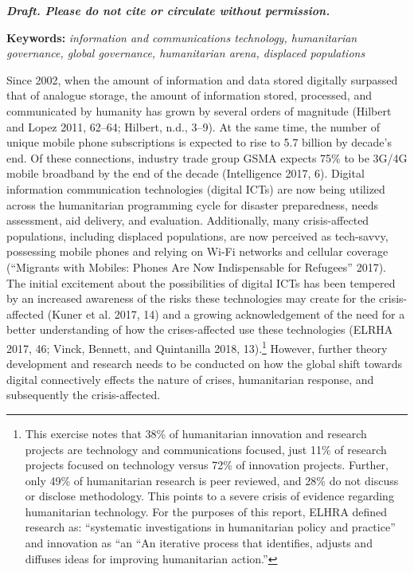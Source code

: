 \textbf{\emph{Draft. Please do not cite or circulate without
permission.}}

\textbf{Keywords:} \emph{information and communications technology,
humanitarian governance, global governance, humanitarian arena,
displaced populations}

Since 2002, when the amount of information and data stored digitally
surpassed that of analogue storage, the amount of information stored,
processed, and communicated by humanity has grown by several orders of
magnitude (Hilbert and Lopez 2011, 62--64; Hilbert, n.d., 3--9). At the
same time, the number of unique mobile phone subscriptions is expected
to rise to 5.7 billion by decade's end. Of these connections, industry
trade group GSMA expects 75\% to be 3G/4G mobile broadband by the end of
the decade (Intelligence 2017, 6). Digital information communication
technologies (digital ICTs) are now being utilized across the
humanitarian programming cycle for disaster preparedness, needs
assessment, aid delivery, and evaluation. Additionally, many
crisis-affected populations, including displaced populations, are now
perceived as tech-savvy, possessing mobile phones and relying on Wi-Fi
networks and cellular coverage (``Migrants with Mobiles: Phones Are Now
Indispensable for Refugees'' 2017). The initial excitement about the
possibilities of digital ICTs has been tempered by an increased
awareness of the risks these technologies may create for the
crisis-affected (Kuner et al. 2017, 14) and a growing acknowledgement of
the need for a better understanding of how the crises-affected use these
technologies (ELRHA 2017, 46; Vinck, Bennett, and Quintanilla 2018,
13).\footnote{This exercise notes that 38\% of humanitarian innovation
  and research projects are technology and communications focused, just
  11\% of research projects focused on technology versus 72\% of
  innovation projects. Further, only 49\% of humanitarian research is
  peer reviewed, and 28\% do not discuss or disclose methodology. This
  points to a severe crisis of evidence regarding humanitarian
  technology. For the purposes of this report, ELHRA defined research
  as: ``systematic investigations in humanitarian policy and practice''
  and innovation as ``an ``An iterative process that identifies, adjusts
  and diffuses ideas for improving humanitarian action.''} However,
further theory development and research needs to be conducted on how the
global shift towards digital connectively effects the nature of crises,
humanitarian response, and subsequently the crisis-affected.

